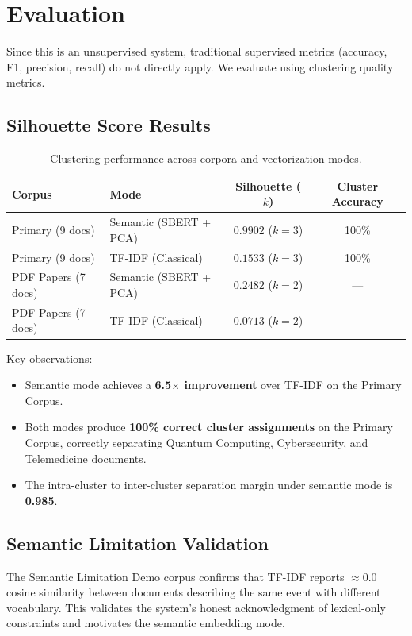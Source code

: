 \documentclass[12pt, a4paper]{article}
\begin{document}
\section{Evaluation}

Since this is an unsupervised system, traditional supervised metrics (accuracy, F1, precision, recall) do not directly apply. We evaluate using clustering quality metrics.

\subsection{Silhouette Score Results}

\begin{table}[H]
\centering
\caption{Clustering performance across corpora and vectorization modes.}
\begin{tabular}{@{}llcc@{}}
\toprule
\textbf{Corpus} & \textbf{Mode} & \textbf{Silhouette ($k$)} & \textbf{Cluster Accuracy} \\
\midrule
Primary (9 docs) & Semantic (SBERT + PCA) & $\mathbf{0.9902}$ ($k=3$) & 100\% \\
Primary (9 docs) & TF-IDF (Classical) & $0.1533$ ($k=3$) & 100\% \\
PDF Papers (7 docs) & Semantic (SBERT + PCA) & $0.2482$ ($k=2$) & --- \\
PDF Papers (7 docs) & TF-IDF (Classical) & $0.0713$ ($k=2$) & --- \\
\bottomrule
\end{tabular}
\end{table}

\noindent Key observations:
\begin{itemize}[nosep]
    \item Semantic mode achieves a \textbf{6.5$\times$ improvement} over TF-IDF on the Primary Corpus.
    \item Both modes produce \textbf{100\% correct cluster assignments} on the Primary Corpus, correctly separating Quantum Computing, Cybersecurity, and Telemedicine documents.
    \item The intra-cluster to inter-cluster separation margin under semantic mode is \textbf{0.985}.
\end{itemize}

\subsection{Semantic Limitation Validation}
The Semantic Limitation Demo corpus confirms that TF-IDF reports $\approx 0.0$ cosine similarity between documents describing the same event with different vocabulary. This validates the system's honest acknowledgment of lexical-only constraints and motivates the semantic embedding mode.
\end{document}
